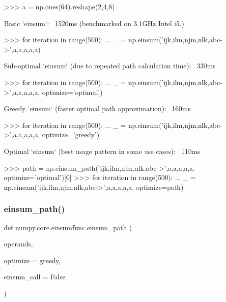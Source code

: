\begin{DoxyVerb}
>>> a = np.ones(64).reshape(2,4,8)

Basic `einsum`: ~1520ms  (benchmarked on 3.1GHz Intel i5.)

>>> for iteration in range(500):
...     _ = np.einsum('ijk,ilm,njm,nlk,abc->',a,a,a,a,a)

Sub-optimal `einsum` (due to repeated path calculation time): ~330ms

>>> for iteration in range(500):
...     _ = np.einsum('ijk,ilm,njm,nlk,abc->',a,a,a,a,a, optimize='optimal')

Greedy `einsum` (faster optimal path approximation): ~160ms

>>> for iteration in range(500):
...     _ = np.einsum('ijk,ilm,njm,nlk,abc->',a,a,a,a,a, optimize='greedy')

Optimal `einsum` (best usage pattern in some use cases): ~110ms

>>> path = np.einsum_path('ijk,ilm,njm,nlk,abc->',a,a,a,a,a, optimize='optimal')[0]
>>> for iteration in range(500):
...     _ = np.einsum('ijk,ilm,njm,nlk,abc->',a,a,a,a,a, optimize=path)\end{DoxyVerb}
 \mbox{\label{namespacenumpy_1_1core_1_1einsumfunc_a629e5a8c16112e405719b3d5cf8b859c}} 
\subsubsection{\texorpdfstring{einsum\+\_\+path()}{einsum\_path()}}
{\footnotesize\ttfamily def numpy.\+core.\+einsumfunc.\+einsum\+\_\+path (\begin{DoxyParamCaption}\item[{}]{operands,  }\item[{}]{optimize = {\ttfamily \textquotesingle{}greedy\textquotesingle{}},  }\item[{}]{einsum\+\_\+call = {\ttfamily False} }\end{DoxyParamCaption})}

